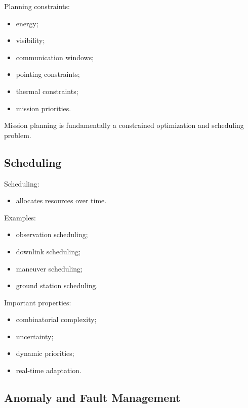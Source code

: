 \documentclass[10pt,a4paper,twocolumn]{article}
\begin{document}
Planning constraints:
\begin{itemize}
    \item energy;
    \item visibility;
    \item communication windows;
    \item pointing constraints;
    \item thermal constraints;
    \item mission priorities.
\end{itemize}

\begin{keybox}
    Mission planning is fundamentally a constrained optimization and scheduling problem.
\end{keybox}


\subsection{Scheduling}

Scheduling:
\begin{itemize}
    \item allocates resources over time.
\end{itemize}

Examples:
\begin{itemize}
    \item observation scheduling;
    \item downlink scheduling;
    \item maneuver scheduling;
    \item ground station scheduling.
\end{itemize}

Important properties:
\begin{itemize}
    \item combinatorial complexity;
    \item uncertainty;
    \item dynamic priorities;
    \item real-time adaptation.
\end{itemize}


\subsection{Anomaly and Fault Management}
\end{document}
